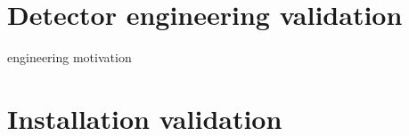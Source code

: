 \section{Detector engineering validation}
engineering motivation

\section{Installation validation}




